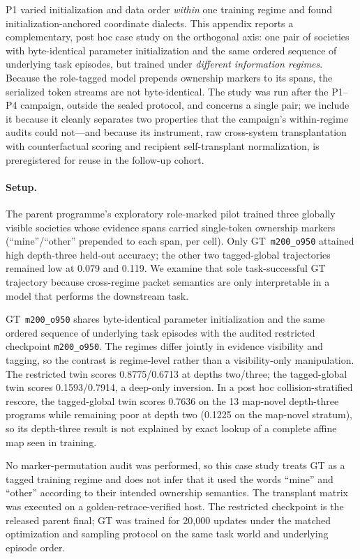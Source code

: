 \documentclass[11pt]{article}
\newcommand{\ckpt}[1]{\texttt{#1}}
\begin{document}
P1 varied initialization and data order \emph{within} one training regime and found initialization-anchored coordinate dialects. This appendix reports a complementary, post hoc case study on the orthogonal axis: one pair of societies with byte-identical parameter initialization and the same ordered sequence of underlying task episodes, but trained under \emph{different information regimes}. Because the role-tagged model prepends ownership markers to its spans, the serialized token streams are not byte-identical. The study was run after the P1--P4 campaign, outside the sealed protocol, and concerns a single pair; we include it because it cleanly separates two properties that the campaign's within-regime audits could not---and because its instrument, raw cross-system transplantation with counterfactual scoring and recipient self-transplant normalization, is preregistered for reuse in the follow-up cohort.

\paragraph{Setup.}
The parent programme's exploratory role-marked pilot trained three globally visible societies whose evidence spans carried single-token ownership markers (``mine''/``other'' prepended to each span, per cell). Only GT~\ckpt{m200\_o950} attained high depth-three held-out accuracy; the other two tagged-global trajectories remained low at 0.079 and 0.119. We examine that sole task-successful GT trajectory because cross-regime packet semantics are only interpretable in a model that performs the downstream task.

GT~\ckpt{m200\_o950} shares byte-identical parameter initialization and the same ordered sequence of underlying task episodes with the audited restricted checkpoint \ckpt{m200\_o950}. The regimes differ jointly in evidence visibility and tagging, so the contrast is regime-level rather than a visibility-only manipulation. The restricted twin scores 0.8775/0.6713 at depths two/three; the tagged-global twin scores 0.1593/0.7914, a deep-only inversion. In a post hoc collision-stratified rescore, the tagged-global twin scores 0.7636 on the 13 map-novel depth-three programs while remaining poor at depth two (0.1225 on the map-novel stratum), so its depth-three result is not explained by exact lookup of a complete affine map seen in training.

No marker-permutation audit was performed, so this case study treats GT as a tagged training regime and does not infer that it used the words ``mine'' and ``other'' according to their intended ownership semantics. The transplant matrix was executed on a golden-retrace-verified host. The restricted checkpoint is the released parent final; GT was trained for 20{,}000 updates under the matched optimization and sampling protocol on the same task world and underlying episode order.
\end{document}
